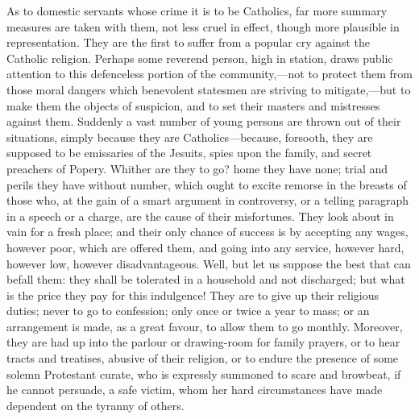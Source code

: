 As to domestic servants whose crime it is to be
Catholics, far more summary measures are taken with them,
not less cruel in effect, though more plausible in
representation. They are the first to suffer from a
popular cry against the Catholic religion. Perhaps some
reverend person, high in station, draws public attention
to this defenceless portion of the community,—not to
protect them from those moral dangers which benevolent
statesmen are striving to mitigate,—but to make them
the objects of suspicion, and to set their masters and
mistresses against them. Suddenly a vast number of young
persons are thrown out of their situations, simply
because they are Catholics—because, forsooth, they
are supposed to be emissaries of the Jesuits, spies upon
the family, and secret preachers of Popery. Whither are
they to go? home they have none; trial and perils they
have without number, which ought to excite remorse in the
breasts of those who, at the gain of a smart argument in
controversy, or a telling paragraph in a speech or a
charge, are the cause of their misfortunes. They look
about in vain for a fresh place; and their only chance of
success is by accepting any wages, however poor, which
are offered them, and going into any service, however
hard, however low, however disadvantageous. Well, but let
us suppose the best that can befall them: they shall be
tolerated in a household and not discharged; but what is
the price they pay for this indulgence! They are to give
up their religious duties; never to go to confession;
only once or twice a year to mass; or an arrangement is
made, as a great favour, to allow them to go monthly.
Moreover, they are had up into the parlour or
drawing-room for family prayers, or to hear tracts and
treatises, abusive of their religion, or to endure the
presence of some solemn Protestant curate, who is
expressly summoned to scare and browbeat, if he cannot
persuade, a safe victim, whom her hard circumstances have
made dependent on the tyranny of others.

